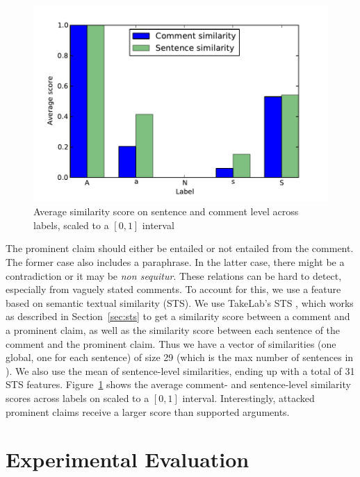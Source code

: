 \begin{figure}
\includegraphics{similarity.pdf}
\caption{Average similarity score  on sentence and comment level across
labels, scaled to a $[0,1]$ interval}
\label{fig:sts_comarg}
\end{figure}

The prominent claim should either be entailed or not entailed from the comment. 
The former case also includes a paraphrase. 
In the latter case, there might be a contradiction or it may be \textit{non sequitur}. 
These relations can be hard to detect, especially from vaguely stated comments. 
To account for this, we use a feature based on semantic textual similarity (STS). 
We use TakeLab's STS \citep{vsaric2012takelab}, which works as described in
Section~\ref{sec:sts} to get a similarity score between 
a comment and a prominent claim, as well as the similarity score between 
each sentence of the comment and the prominent claim. 
Thus we have a vector of similarities (one global, one for each sentence) of size
29 (which is the max number of sentences in \ComArg ). 
We also use the mean of sentence-level similarities, ending up with a total of 31 STS features. 
Figure~\ref{fig:sts_comarg} shows the average comment- and sentence-level similarity scores
across labels on \ComArg scaled to a $[0, 1]$ interval.
Interestingly, attacked prominent claims receive a larger score than supported
arguments. 

\section{Experimental Evaluation}
\label{sec:argrec_experiments}

